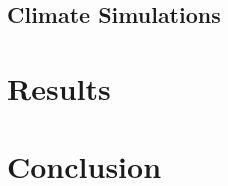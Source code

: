 \documentclass[ oneside,%
                    author={George Herbert},
                    degree={MSci},
                     title={Video Diffusion Models for Climate Simulations},
                  subtitle={}]{dissertation}
\begin{document}
\section{Climate Simulations}
\label{sec:background_climate}


\chapter{Results}
\label{chap:results}


\chapter{Conclusion}
\label{chap:conclusion}


%
%
%

\backmatter




\end{document}
